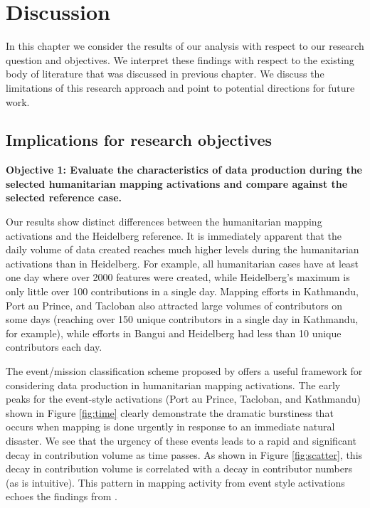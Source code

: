 \chapter{Discussion}
\label{chapterlabel6}

In this chapter we consider the results of our analysis with respect to our research question and objectives. We interpret these findings with respect to the existing body of literature that was discussed in previous chapter. We discuss the limitations of this research approach and point to potential directions for future work. 

\section{Implications for research objectives}

\noindent\textbf{Objective 1: Evaluate the characteristics of data production during the selected humanitarian mapping activations and compare against the selected reference case.} 

Our results show distinct differences between the humanitarian mapping activations and the Heidelberg reference. It is immediately apparent that the daily volume of data created reaches much higher levels during the humanitarian activations than in Heidelberg. For example, all humanitarian cases have at least one day where over 2000 features were created, while Heidelberg's maximum is only little over 100 contributions in a single day. Mapping efforts in Kathmandu, Port au Prince, and Tacloban also attracted large volumes of contributors on some days (reaching over 150 unique contributors in a single day in Kathmandu, for example), while efforts in Bangui and Heidelberg had less than 10 unique contributors each day. 

The event/mission classification scheme proposed by \textcite{dittus_mass_2017} offers a useful framework for considering data production in humanitarian mapping activations. The early peaks for the event-style activations (Port au Prince, Tacloban, and Kathmandu) shown in Figure \ref{fig:time} clearly demonstrate the dramatic burstiness that occurs when mapping is done urgently in response to an immediate natural disaster. We see that the urgency of these events leads to a rapid and significant decay in contribution volume as time passes. As shown in Figure \ref{fig:scatter}, this decay in contribution volume is correlated with a decay in contributor numbers (as is intuitive). This pattern in mapping activity from event style activations echoes the findings from \textcite[p. 1294]{dittus_mass_2017}.

